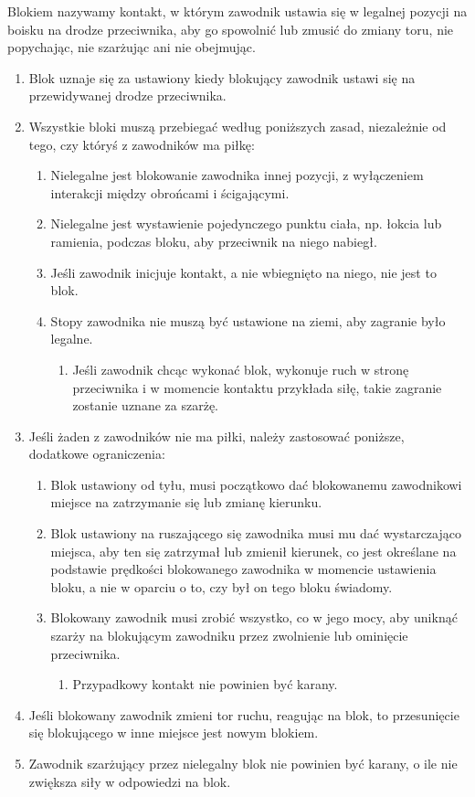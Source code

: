 \documentclass[11pt,a4paper]{article}
\renewcommand{\subsubsection}[1]{
  \oldsubsubsection{#1}%
  \label{\thesubsubsection}
}
\begin{document}
\subsubsection{Bloki}
Blokiem nazywamy kontakt, w którym zawodnik ustawia się w legalnej pozycji na boisku na drodze przeciwnika, aby go spowolnić lub zmusić do zmiany toru, nie popychając, nie szarżując ani nie obejmując.
\begin{enumerate}
  \item Blok uznaje się za ustawiony kiedy blokujący zawodnik ustawi się na przewidywanej drodze przeciwnika.
  \item Wszystkie bloki muszą przebiegać według poniższych zasad, niezależnie od tego, czy któryś z zawodników ma piłkę:
  \begin{enumerate}
    \item Nielegalne jest blokowanie zawodnika innej pozycji, z wyłączeniem interakcji między obrońcami i ścigającymi.
    \item Nielegalne jest wystawienie pojedynczego punktu ciała, np. łokcia lub ramienia, podczas bloku, aby przeciwnik na niego nabiegł.
    \item Jeśli zawodnik inicjuje kontakt, a nie wbiegnięto na niego, nie jest to blok.
    \item Stopy zawodnika nie muszą być ustawione na ziemi, aby zagranie było legalne.
    \begin{enumerate}
      \item Jeśli zawodnik chcąc wykonać blok, wykonuje ruch w stronę przeciwnika i w momencie kontaktu przykłada siłę, takie zagranie zostanie uznane za szarżę.
    \end{enumerate}
  \end{enumerate}
  \item Jeśli żaden z zawodników nie ma piłki, należy zastosować poniższe, dodatkowe ograniczenia:
  \begin{enumerate}
    \item Blok ustawiony od tyłu, musi początkowo dać blokowanemu zawodnikowi miejsce na zatrzymanie się lub zmianę kierunku.
    \item Blok ustawiony na ruszającego się zawodnika musi mu dać wystarczająco miejsca, aby ten się zatrzymał lub zmienił kierunek, co jest określane na podstawie prędkości blokowanego zawodnika w momencie ustawienia bloku, a nie w oparciu o to, czy był on tego bloku świadomy.
    \item Blokowany zawodnik musi zrobić wszystko, co w jego mocy, aby uniknąć szarży na blokującym zawodniku przez zwolnienie lub ominięcie przeciwnika.
    \begin{enumerate}
      \item Przypadkowy kontakt nie powinien być karany.
    \end{enumerate}
  \end{enumerate}
  \item Jeśli blokowany zawodnik zmieni tor ruchu, reagując na blok, to przesunięcie się blokującego w inne miejsce jest nowym blokiem.
  \item Zawodnik szarżujący przez nielegalny blok nie powinien być karany, o ile nie zwiększa siły w odpowiedzi na blok.
\end{enumerate}
\end{document}

